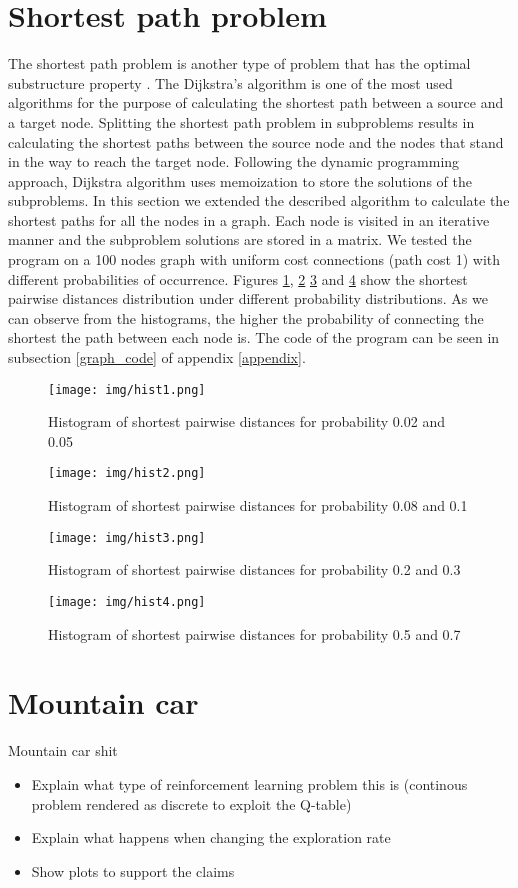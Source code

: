 \documentclass[runningheads]{llncs}
\begin{document}
\section{Shortest path problem}
The shortest path problem is another type of problem that has the
optimal substructure property \cite{dijkstra}. The Dijkstra's
algorithm is one of the most used algorithms for the purpose of
calculating the shortest path between a source and a target
node. Splitting the shortest path problem in subproblems results in
calculating the shortest paths between the source node and the nodes
that stand in the way to reach the target node. Following the dynamic
programming approach, Dijkstra algorithm uses memoization to store the
solutions of the subproblems. In this section we extended the
described algorithm to calculate the shortest paths for all the nodes
in a graph. Each node is visited in an iterative manner and the
subproblem solutions are stored in a matrix. We tested the program on
a 100 nodes graph with uniform cost connections (path cost 1) with
different probabilities of occurrence. Figures \ref{hist1},
\ref{hist2} \ref{hist3} and \ref{hist4} show the shortest pairwise
distances distribution under different probability distributions. As
we can observe from the histograms, the higher the probability of
connecting the shortest the path between each node is. 
The code of the program can be seen in subsection \ref{graph_code} of
appendix \ref{appendix}.
\begin{figure}
\texttt{[image: img/hist1.png]}
\caption{Histogram of shortest pairwise distances for probability 0.02
and 0.05} \label{hist1}
\end{figure}
\begin{figure}
\texttt{[image: img/hist2.png]}
\caption{Histogram of shortest pairwise distances for probability 0.08
and 0.1} \label{hist2}
\end{figure}
\begin{figure}
\texttt{[image: img/hist3.png]}
\caption{Histogram of shortest pairwise distances for probability 0.2
and 0.3} \label{hist3}
\end{figure}
\begin{figure}
\texttt{[image: img/hist4.png]}
\caption{Histogram of shortest pairwise distances for probability 0.5
and 0.7} \label{hist4}
\end{figure}

\section{Mountain car}
Mountain car shit
\begin{itemize}
\item Explain what type of reinforcement learning problem this is
  (continous problem rendered as discrete to exploit the Q-table)
\item Explain what happens when changing the exploration rate
\item Show plots to support the claims
\end{itemize}
\end{document}
